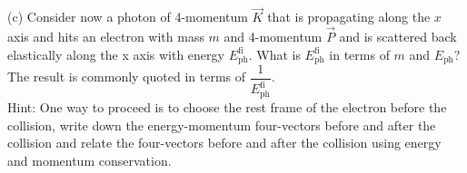 \begin{example}
    (c) Consider now a photon of 4-momentum $\vec{K}$ that is propagating along the $x$ axis and hits an electron with mass $m$ and 4-momentum $\vec{P}$ and is scattered back elastically along the x axis with energy $E_{\mathrm{ph}}^{\mathrm{fi}}.$ What is $E_\mathrm{ph}^\mathrm{fi}$ in terms of $m$ and $E_\mathrm{ph}?$ The result is commonly quoted in terms of $\dfrac{1}{E_\mathrm{ph}^\mathrm{fi}}$.\\
    Hint: One way to proceed is to choose the rest frame of the electron before the collision, write down the energy-momentum four-vectors before and after the collision and relate the four-vectors before and after the collision using energy and momentum conservation.
\end{example}